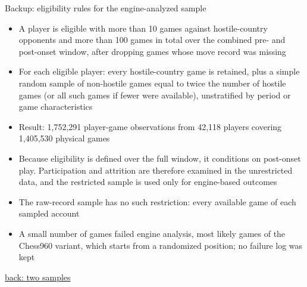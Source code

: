 \documentclass[aspectratio=169,11pt,t]{beamer}
\newcommand{\backto}[2]{\vfill\hfill\hyperlink{#1}{\textcolor{linkblue}{\scriptsize\textsf{back: #2}}}}
\begin{document}
\begin{frame}[label=bk-eligibility]{Backup: eligibility rules for the engine-analyzed sample}
  \small
  \begin{itemize}
    \item A player is eligible with more than 10 games against hostile-country opponents and more than 100 games in total over the combined pre- and post-onset window, after dropping games whose move record was missing
    \item For each eligible player: every hostile-country game is retained, plus a simple random sample of non-hostile games equal to twice the number of hostile games (or all such games if fewer were available), unstratified by period or game characteristics
    \item Result: 1,752,291 player-game observations from 42,118 players covering 1,405,530 physical games
    \item Because eligibility is defined over the full window, it conditions on post-onset play. Participation and attrition are therefore examined in the unrestricted data, and the restricted sample is used only for engine-based outcomes
    \item The raw-record sample has no such restriction: every available game of each sampled account
    \item A small number of games failed engine analysis, most likely games of the Chess960 variant, which starts from a randomized position; no failure log was kept
  \end{itemize}
  \backto{samples}{two samples}
\end{frame}
\end{document}
